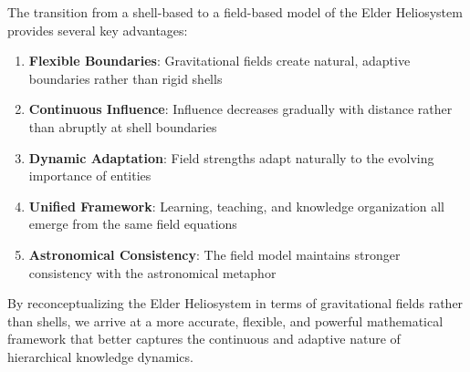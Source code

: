 The transition from a shell-based to a field-based model of the Elder Heliosystem provides several key advantages:

\begin{enumerate}
    \item \textbf{Flexible Boundaries}: Gravitational fields create natural, adaptive boundaries rather than rigid shells
    \item \textbf{Continuous Influence}: Influence decreases gradually with distance rather than abruptly at shell boundaries
    \item \textbf{Dynamic Adaptation}: Field strengths adapt naturally to the evolving importance of entities
    \item \textbf{Unified Framework}: Learning, teaching, and knowledge organization all emerge from the same field equations
    \item \textbf{Astronomical Consistency}: The field model maintains stronger consistency with the astronomical metaphor
\end{enumerate}

By reconceptualizing the Elder Heliosystem in terms of gravitational fields rather than shells, we arrive at a more accurate, flexible, and powerful mathematical framework that better captures the continuous and adaptive nature of hierarchical knowledge dynamics.
